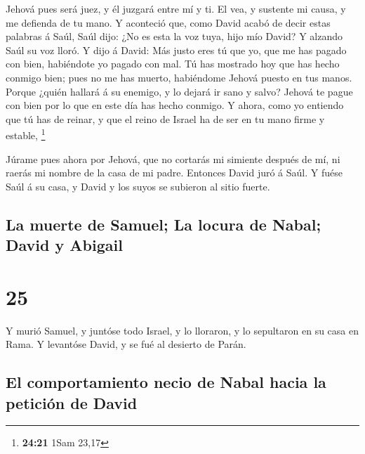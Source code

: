  Jehová pues será juez, y él juzgará entre mí y ti. El vea,
y sustente mi causa, y me defienda de tu mano.  Y aconteció
que, como David acabó de decir estas palabras á Saúl, Saúl dijo: ¿No es
esta la voz tuya, hijo mío David? Y alzando Saúl su voz lloró.
 Y dijo á David: Más justo eres tú que yo, que me has
pagado con bien, habiéndote yo pagado con mal.  Tú has
mostrado hoy que has hecho conmigo bien; pues no me has muerto,
habiéndome Jehová puesto en tus manos.  Porque ¿quién
hallará á su enemigo, y lo dejará ir sano y salvo? Jehová te pague con
bien por lo que en este día has hecho conmigo.  Y ahora,
como yo entiendo que tú has de reinar, y que el reino de Israel ha de
ser en tu mano firme y estable, \footnote{\textbf{24:21} 1Sam 23,17}

 Júrame pues ahora por Jehová, que no cortarás mi simiente
después de mí, ni raerás mi nombre de la casa de mi padre. Entonces
David juró á Saúl. Y fuése Saúl á su casa, y David y los suyos se
subieron al sitio fuerte.

\hypertarget{la-muerte-de-samuel-la-locura-de-nabal-david-y-abigail}{%
\subsection{La muerte de Samuel; La locura de Nabal; David y
Abigail}\label{la-muerte-de-samuel-la-locura-de-nabal-david-y-abigail}}

\hypertarget{section-24}{%
\section{25}\label{section-24}}

 Y murió Samuel, y juntóse todo Israel, y lo lloraron, y lo
sepultaron en su casa en Rama. Y levantóse David, y se fué al desierto
de Parán.

\hypertarget{el-comportamiento-necio-de-nabal-hacia-la-peticiuxf3n-de-david}{%
\subsection{El comportamiento necio de Nabal hacia la petición de
David}\label{el-comportamiento-necio-de-nabal-hacia-la-peticiuxf3n-de-david}}

